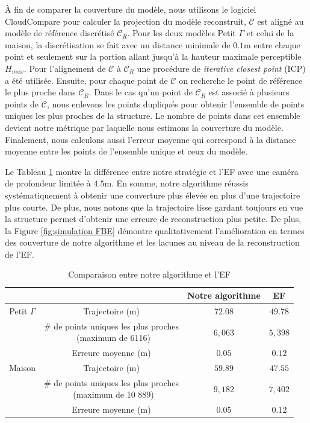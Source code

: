 À fin de comparer la couverture du modèle, nous utilisons le logiciel CloudCompare pour calculer la projection du modèle reconstruit, $\mathcal C$ est aligné au modèle de référence discrétisé $\mathcal C_R$. Pour les deux modèles Petit $\Gamma$ et celui de la maison, la discrétisation se fait avec un distance minimale de $0.1$m entre chaque point et seulement sur la portion allant jusqu'à la hauteur maximale perceptible $H_{max}$. Pour l'alignement de $\mathcal C$  à $\mathcal C_R$ une procédure de \textit{iterative closest point} (ICP) \citep{Rusinkiewicz2001} a été utilisée. Ensuite, pour chaque point de $\mathcal C$ on recherche le point de référence le plus proche dans $\mathcal C_R$. Dans le cas qu'un point de $\mathcal C_R$ est associé à plusieurs points de $\mathcal C$, nous enlevons les points dupliqués pour obtenir l'ensemble de points uniques les plus proches de la structure. Le nombre de points dans cet ensemble devient notre métrique par laquelle nous estimons la couverture du modèle. Finalement, nous calculons aussi l'erreur moyenne qui correspond à la distance moyenne entre les points de l'ensemble unique et ceux du modèle.

Le Tableau \ref{tbl: simulation results 3} montre la différence entre notre stratégie et l'EF avec une caméra de profondeur limitée à $4.5$m. En somme, notre algorithme réussis systématiquement à obtenir une couverture plus élevée en plus d'une trajectoire plus courte. De plus, nous notons que la trajectoire lisse gardant toujours en vue la structure permet d'obtenir une erreure de reconstruction plus petite. De plus, la Figure \ref{fig:simulation FBE} démontre qualitativement l'amélioration en termes des couverture de notre algorithme et les lacunes au niveau de la reconstruction de l'EF.

\begin{table}[!ht]
\renewcommand{\arraystretch}{1.3}
\caption{Comparaison entre notre algorithme et l'EF}
\label{tbl: simulation results 3}
\centering
\begin{tabular}{|c|c|c|c|}
\cline{3-4}
\multicolumn{2}{c|}{} & Notre algorithme & EF \\
\hline
{Petit $\Gamma$} & Trajectoire (m)            & $72.08$  & $49.78$  \\\cline{2-4}
								& \specialcell{\# de points uniques les plus proches \\ (maximum de 6116)} & $6,063$          & $5,398$          \\\cline{2-4}
								& Erreure moyenne (m)             & $0.05$ & $0.12$\\\cline{2-4}
\hline
{Maison} & Trajectoire (m) & $59.89$ & $47.55$ \\\cline{2-4}
					   & \specialcell{\# de points uniques les plus proches \\ (maximum de 10 889)} & $9,182$ & $7,402$ \\\cline{2-4}
					   &  Erreure moyenne (m)             & $0.05$ & $0.12$\\\cline{2-4}
\hline
\end{tabular}
\end{table}



